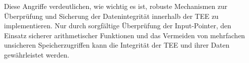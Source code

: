 Diese Angriffe verdeutlichen, wie wichtig es ist, robuste Mechanismen zur Überprüfung und Sicherung der Datenintegrität innerhalb der TEE zu implementieren. Nur durch sorgfältige Überprüfung der Input-Pointer, den Einsatz sicherer arithmetischer Funktionen und das Vermeiden von mehrfachen unsicheren Speicherzugriffen kann die Integrität der TEE und ihrer Daten gewährleistet werden.
